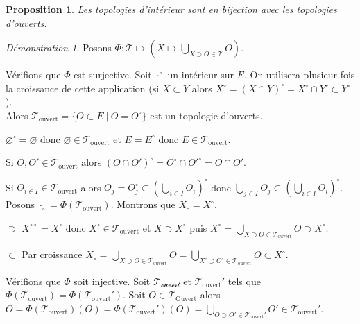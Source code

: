 \documentclass[a4paper, 11pt, french]{book}
\newenvironment{itemise}{\itemize}{\enditemize}
\theoremstyle{plain} %
\newtheorem{proposition}{Proposition}
\theoremstyle{definition} %
\theoremstyle{remark} %
\newtheorem*{demonstration}{Démonstration}
\newcommand{\1}{\mathds{1}}
\newcommand\vide{\varnothing}
\newcommand\ens[2]{\{#1 \ |\ #2\}}
\begin{document}
\begin{proposition}
	Les topologies d'intérieur sont en bijection avec les topologies d'ouverts.
\end{proposition}

\begin{demonstration}
	Posons $\Phi\colon\mathscr{T}\mapsto(X\mapsto\bigcup_{X\supset O\in\mathscr{T}}O)$.
	\begin{itemise}
		\item Vérifions que $\Phi$ est surjective.
		Soit $\cdot^\circ$ un intérieur sur $E$.
		On utilisera plusieur fois la croissance de cette application (si $X\subset Y$ alors $X^\circ=(X\cap Y)^\circ=X^\circ\cap Y^\circ\subset Y^\circ$). \\
		Alors $\mathscr{T}_\text{ouvert}=\ens{O\subset E}{O=O^\circ}$ est un topologie d'ouverts.
		\begin{itemise}
			\item $\vide^\circ=\vide$ donc $\vide\in\mathscr{T}_\text{ouvert}$ et $E=E^\circ$ donc $E\in\mathscr{T}_\text{ouvert}$.
			\item Si $O, O'\in\mathscr{T}_\text{ouvert}$
			alors $(O\cap O')^\circ=O^\circ\cap{O'}^\circ=O\cap O'$.
			\item Si $O_{i\in I}\in\mathscr{T}_\text{ouvert}$
			alors $O_j=O_j^\circ\subset(\bigcup_{i\in I}O_i)^\circ$
			donc $\bigcup_{j\in I}O_j\subset(\bigcup_{i\in I}O_i)^\circ$.
		\end{itemise}
		Posons $\cdot_\circ=\Phi(\mathscr{T}_\text{ouvert})$.
		Montrons que $X_\circ=X^\circ$.
		\begin{itemise}
			\item[$\supset$] $X^{\circ\circ}=X^\circ$ donc $X^\circ\in\mathscr{T}_\text{ouvert}$ et $X\supset X^\circ$ puis $X^\circ=\bigcup_{X\supset O\in\mathscr{T}_\text{ouvert}}O\supset X^\circ$.
			\item[$\subset$] Par croissance $X_\circ=\bigcup_{X\supset O\in\mathscr{T}_\text{ouvert}}O=\bigcup_{X^\circ\supset O^\circ\in\mathscr{T}_\text{ouvert}}O\subset X^\circ$.
		\end{itemise}
		\item Vérifions que $\Phi$ soit injective.
		Soit $\mathscr{T_\text{ouvert}}$ et $\mathscr{T}_\text{ouvert}'$ tels que $\Phi(\mathscr{T}_\text{ouvert})=\Phi(\mathscr{T}_\text{ouvert}')$.
		Soit $O\in\mathscr{T}_\text{Ouvert}$ alors $O=\Phi(\mathscr{T}_\text{ouvert})(O)=\Phi(\mathscr{T}_\text{ouvert}')(O)=\bigcup_{O\supset O'\in\mathscr{T}_\text{ouvert}'}O'\in\mathscr{T}_\text{ouvert}'$.
	\end{itemise}
\end{demonstration}
\end{document}

